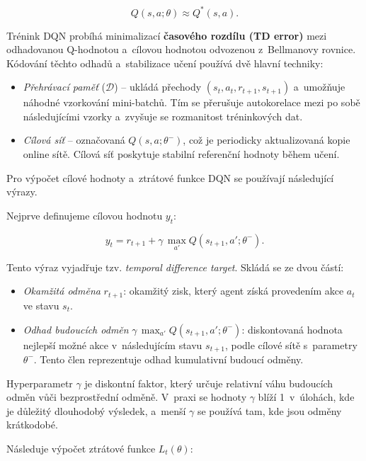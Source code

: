 \begin{equation}
Q(s,a;\theta)\approx Q^*(s,a).
\end{equation}

Trénink DQN probíhá minimalizací \textbf{časového rozdílu (TD error)} mezi odhadovanou Q-hodnotou a~cílovou hodnotou odvozenou z~Bellmanovy rovnice. Kódování těchto odhadů a~stabilizace učení používá dvě hlavní techniky:

\begin{itemize}
    \item \textit{Přehrávací paměť} (\(\mathcal{D}\)) – ukládá přechody \((s_t,a_t,r_{t+1},s_{t+1})\) a~umožňuje náhodné vzorkování mini-batchů. Tím se přerušuje autokorelace mezi po sobě následujícími vzorky a~zvyšuje se rozmanitost tréninkových dat.
    \item \textit{Cílová síť} – označovaná \(Q(s,a;\theta^-)\), což je periodicky aktualizovaná kopie online sítě. Cílová síť poskytuje stabilní referenční hodnoty během učení.
\end{itemize}

\newpage

Pro výpočet cílové hodnoty a~ztrátové funkce DQN se používají následující výrazy.

Nejprve definujeme cílovou hodnotu \(y_t\):

\begin{equation}
y_t = r_{t+1} + \gamma\,\max_{a'}Q(s_{t+1},a';\theta^-).
\end{equation}

Tento výraz vyjadřuje tzv. \textit{temporal difference target}. Skládá se ze dvou částí:
\begin{itemize}
    \item \textit{Okamžitá odměna} \(r_{t+1}\): okamžitý zisk, který agent získá provedením akce \(a_t\) ve stavu \(s_t\).
    \item \textit{Odhad budoucích odměn} \(\gamma\,\max_{a'}Q(s_{t+1},a';\theta^-)\): diskontovaná hodnota nejlepší možné akce v~následujícím stavu \(s_{t+1}\), podle cílové sítě s~parametry \(\theta^-\). Tento člen reprezentuje odhad kumulativní budoucí odměny.
\end{itemize}

Hyperparametr \(\gamma\) je diskontní faktor, který určuje relativní váhu budoucích odměn vůči bezprostřední odměně. V~praxi se hodnoty \(\gamma\) blíží 1~v~úlohách, kde je důležitý dlouhodobý výsledek, a~menší \(\gamma\) se používá tam, kde jsou odměny krátkodobé.

Následuje výpočet ztrátové funkce \(L_t(\theta)\):

